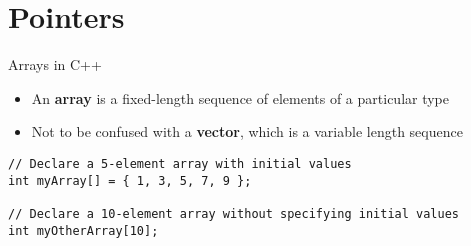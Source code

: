 \part{Pointers}
\frame{\partpage}

\begin{frame}[fragile]{Arrays in C++}
    \begin{itemize}
        \item An \textbf{array} is a fixed-length sequence of elements of a particular type \pause
        \item Not to be confused with a \textbf{vector}, which is a variable length sequence \pause
    \end{itemize}
    \begin{lstlisting}
// Declare a 5-element array with initial values
int myArray[] = { 1, 3, 5, 7, 9 };

// Declare a 10-element array without specifying initial values
int myOtherArray[10];
    \end{lstlisting}
\end{frame}
